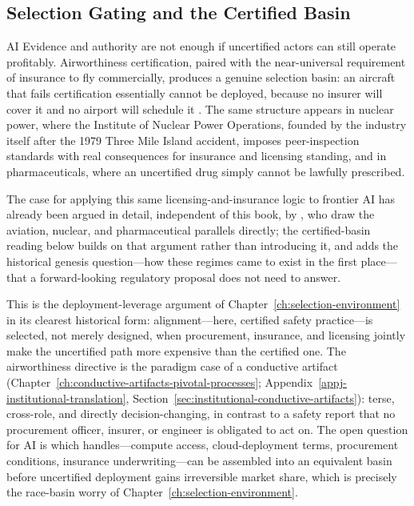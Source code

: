 \begin{refsection}
\section{Selection Gating and the Certified Basin}
\label{sec:appm-selection-gating}
\begin{authbar}{AI}
Evidence and authority are not enough if uncertified actors can still operate profitably.
Airworthiness certification, paired with the near-universal requirement of insurance to fly commercially, produces a genuine selection basin: an aircraft that fails certification essentially cannot be deployed, because no insurer will cover it and no airport will schedule it \autocite{herkert2020boeing}.
The same structure appears in nuclear power, where the Institute of Nuclear Power Operations, founded by the industry itself after the 1979 Three Mile Island accident, imposes peer-inspection standards with real consequences for insurance and licensing standing, and in pharmaceuticals, where an uncertified drug simply cannot be lawfully prescribed.

The case for applying this same licensing-and-insurance logic to frontier AI has already been argued in detail, independent of this book, by \textcite{anderljung2023frontier}, who draw the aviation, nuclear, and pharmaceutical parallels directly; the certified-basin reading below builds on that argument rather than introducing it, and adds the historical genesis question---how these regimes came to exist in the first place---that a forward-looking regulatory proposal does not need to answer.

This is the deployment-leverage argument of Chapter~\ref{ch:selection-environment} in its clearest historical form: alignment---here, certified safety practice---is selected, not merely designed, when procurement, insurance, and licensing jointly make the uncertified path more expensive than the certified one.
The airworthiness directive is the paradigm case of a conductive artifact (Chapter~\ref{ch:conductive-artifacts-pivotal-processes}; Appendix~\ref{appj-institutional-translation}, Section~\ref{sec:institutional-conductive-artifacts}): terse, cross-role, and directly decision-changing, in contrast to a safety report that no procurement officer, insurer, or engineer is obligated to act on.
The open question for AI is which handles---compute access, cloud-deployment terms, procurement conditions, insurance underwriting---can be assembled into an equivalent basin before uncertified deployment gains irreversible market share, which is precisely the race-basin worry of Chapter~\ref{ch:selection-environment}.


\end{authbar}
\end{refsection}
